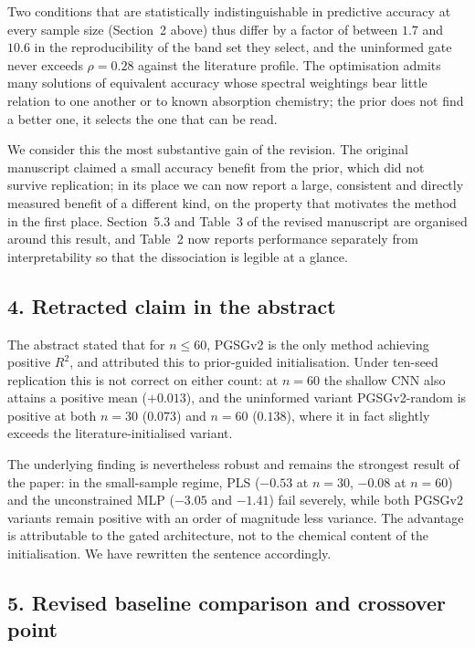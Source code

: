 Two conditions that are statistically indistinguishable in predictive
accuracy at every sample size (Section~2 above) thus differ by a factor of
between $1.7$ and $10.6$ in the reproducibility of the band set they select,
and the uninformed gate never exceeds $\rho = 0.28$ against the literature
profile. The optimisation admits many solutions of equivalent accuracy whose
spectral weightings bear little relation to one another or to known
absorption chemistry; the prior does not find a better one, it selects the
one that can be read.

We consider this the most substantive gain of the revision. The original
manuscript claimed a small accuracy benefit from the prior, which did not
survive replication; in its place we can now report a large, consistent and
directly measured benefit of a different kind, on the property that
motivates the method in the first place. Section~5.3 and Table~3 of the
revised manuscript are organised around this result, and Table~2 now reports
performance separately from interpretability so that the dissociation is
legible at a glance.

\subsection*{4. Retracted claim in the abstract}

The abstract stated that for $n \leq 60$, PGSGv2 is the only method achieving
positive $R^2$, and attributed this to prior-guided initialisation. Under
ten-seed replication this is not correct on either count: at $n = 60$ the
shallow CNN also attains a positive mean ($+0.013$), and the uninformed
variant PGSGv2-random is positive at both $n = 30$ ($0.073$) and $n = 60$
($0.138$), where it in fact slightly exceeds the literature-initialised
variant.

The underlying finding is nevertheless robust and remains the strongest
result of the paper: in the small-sample regime, PLS ($-0.53$ at $n = 30$,
$-0.08$ at $n = 60$) and the unconstrained MLP ($-3.05$ and $-1.41$) fail
severely, while both PGSGv2 variants remain positive with an order of
magnitude less variance. The advantage is attributable to the gated
architecture, not to the chemical content of the initialisation. We have
rewritten the sentence accordingly.

\subsection*{5. Revised baseline comparison and crossover point}

